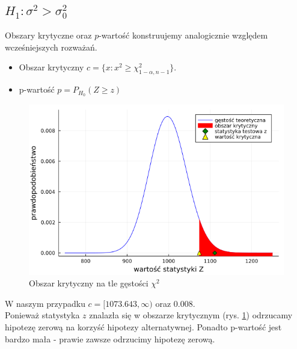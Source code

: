\documentclass{article}
\theoremstyle{break}
\begin{document}
\subsection{$H_1: \sigma^2  > \sigma^2_0$}	
Obszary krytyczne oraz $p$-wartość konstruujemy analogicznie względem wcześniejszych rozważań.
\begin{itemize}
	\item Obszar krytyczny $c=\{x: x^2\geq \chi^2_{1-\alpha,n-1}\}$.
	\item p-wartość $p=P_{H_0}(Z\geq z)$
\end{itemize}
\begin{figure}[H]
	\begin{center}
		\includegraphics[scale=0.5]{Z2.2.png}
		\caption{Obszar krytyczny na tle gęstości $\chi^2$}
		\label{fig:5}
	\end{center}
\end{figure}
W naszym przypadku $c=[1073.643,\infty)$ oraz $0.008$.\\
Ponieważ statystyka $z$ znalazła się w obszarze krytycznym (rys. \ref{fig:5}) odrzucamy hipotezę zerową na korzyść hipotezy alternatywnej. Ponadto p-wartość jest bardzo mała - prawie zawsze odrzucimy hipotezę zerową.
\newpage
\end{document}

